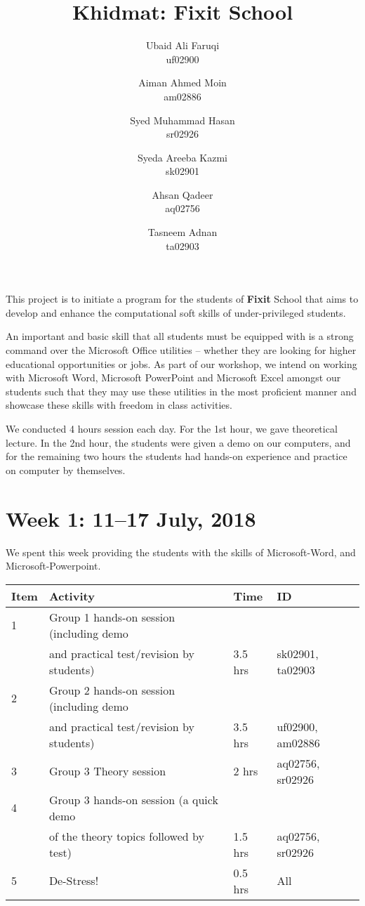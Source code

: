 \documentclass{article}
\title {Khidmat: Fixit School}
\author{
  Ubaid Ali Faruqi\\ uf02900
  \and
  Aiman Ahmed Moin\\ am02886
  \and
  Syed Muhammad Hasan\\ sr02926
  \and
  Syeda Areeba Kazmi\\ sk02901
  \and 
  Ahsan Qadeer\\ aq02756
  \and
  Tasneem Adnan\\ ta02903
}
\date{}
\begin{document}
\maketitle


This project is to initiate a program for the students of \textbf{Fixit} School that aims to develop and
enhance the computational soft skills of under-privileged  students.



An important and basic skill that all students must be equipped with is a strong command over the Microsoft Office utilities – whether they are looking for higher educational opportunities or jobs. As part of our workshop, we intend on working with Microsoft Word, Microsoft PowerPoint and Microsoft Excel amongst our students such that they may use these utilities in the most proficient manner and showcase these skills with freedom in class activities.

We conducted 4 hours session each day. For the 1st hour, we gave theoretical lecture. In the 2nd hour, the students were given a demo on our computers, and for the remaining two hours the students had hands-on experience and practice on computer by themselves.

\newpage %
\section*{Week 1: 11--17 July, 2018}

We spent this week providing the students with the skills of Microsoft-Word, and Microsoft-Powerpoint.

\begin{tabular}{|l|l|l|l|}
  \hline
  Item 	& Activity & Time & ID \\\hline\hline
  1	& Group 1 hands-on session (including demo&&\\ &and practical test/revision by students) & 3.5 hrs & sk02901, ta02903 \\\hline
  2	& Group 2 hands-on session (including demo&&\\ &and practical test/revision by students) & 3.5 hrs & uf02900, am02886 \\\hline
  3	& Group 3 Theory session & 2 hrs & aq02756, sr02926 \\\hline
  4	& Group 3 hands-on session (a quick demo&&\\ &of the theory topics followed by test) & 1.5 hrs & aq02756, sr02926 \\\hline
  5	& De-Stress! & 0.5 hrs & All \\\hline    
\end{tabular}
\end{document}
